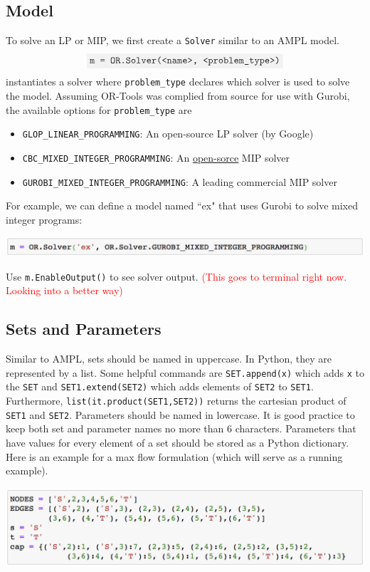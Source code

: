 \documentclass[11 pt]{article}
\newcommand{\code}[1]{\colorbox{gray!10}{\textcolor{black!85}{\texttt{#1}}}}
\begin{document}
\subsection{Model}

To solve an LP or MIP, we first create a \texttt{Solver} similar to an AMPL model. $$\code{m = OR.Solver(<name>, <problem\_type>)}$$ instantiates a solver where \texttt{problem\_type} declares which solver is used to solve the model. Assuming OR-Tools was complied from source for use with Gurobi, the available options for \texttt{problem\_type} are
\begin{itemize}
\item \texttt{GLOP\_LINEAR\_PROGRAMMING}: An open-source LP solver (by Google)
\item \texttt{CBC\_MIXED\_INTEGER\_PROGRAMMING}: An \href{https://github.com/coin-or/Cbc}{open-sorce} MIP solver
\item \texttt{GUROBI\_MIXED\_INTEGER\_PROGRAMMING}: A leading commercial MIP solver
\end{itemize}
For example, we can define a model named ``ex" that uses Gurobi to solve mixed integer programs:
\begin{center}
\includegraphics[scale=0.7]{images/model.png}
\end{center}
Use \code{m.EnableOutput()} to see solver output. \textcolor{red}{(This goes to terminal right now. Looking into a better way)}

\subsection{Sets and Parameters}

Similar to AMPL, sets should be named in uppercase. In Python, they are represented by a list. Some helpful commands are \code{SET.append(x)} which adds \texttt{x} to the \texttt{SET} and \code{SET1.extend(SET2)} which adds elements of \texttt{SET2} to \texttt{SET1}. Furthermore, \code{list(it.product(SET1,SET2))} returns the cartesian product of \texttt{SET1} and \texttt{SET2}. Parameters should be named in lowercase. It is good practice to keep both set and parameter names no more than 6 characters. Parameters that have values for every element of a set should be stored as a Python dictionary. Here is an example for a max flow formulation (which will serve as a running example).
\begin{center}
\includegraphics[scale=0.7]{images/setAndParam.png}
\end{center}
\end{document}
